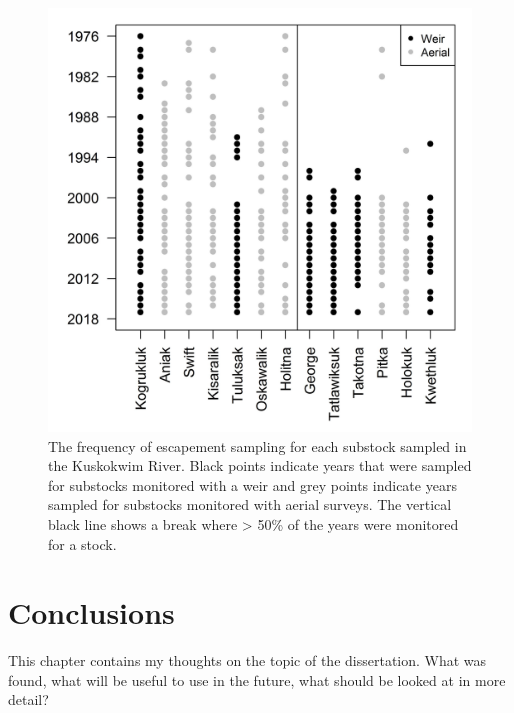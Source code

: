 \documentclass[12pt,]{book}
\theoremstyle{definition}
\theoremstyle{definition}
\theoremstyle{definition}
\theoremstyle{remark}
\begin{document}
\clearpage

\begin{figure}
  \centering
  \includegraphics{img/Ch4/obs-freq.jpg}
  \caption{The frequency of escapement sampling for each substock sampled in the Kuskokwim River. Black points indicate years that were sampled for substocks monitored with a weir and grey points indicate years sampled for substocks monitored with aerial surveys. The vertical black line shows a break where > 50\% of the years were monitored for a stock.}
  \label{fig:obs-freq}
\end{figure}

\doublespacing

\chapter{Conclusions}\label{ch5}

This chapter contains my thoughts on the topic of the dissertation. What
was found, what will be useful to use in the future, what should be
looked at in more detail?

\setlength{\parskip}{6pt plus 2pt minus 1pt}


\end{document}

